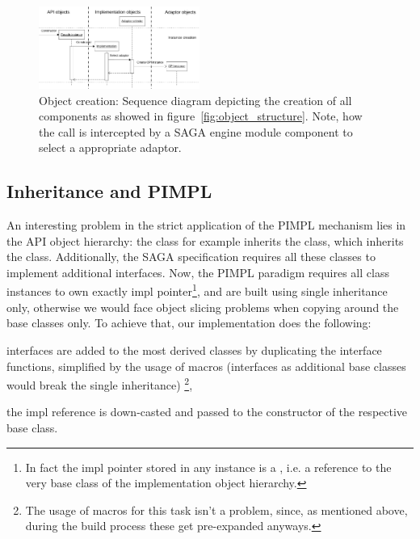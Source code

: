 \begin{figure}[!ht]
 \begin{center}
  \includegraphics[width=0.47\textwidth]{images/object_lifetime_creation}
  \caption{\label{fig:object_creation}
    Object creation: Sequence diagram depicting the creation of all
    components as showed in figure~\ref{fig:object_structure}. Note, how
    the call is intercepted by a SAGA engine module component to select 
    a appropriate adaptor.}
 \end{center}
\end{figure}

\subsection{Inheritance and PIMPL}

An interesting problem in the strict application of the PIMPL
mechanism lies in the API object hierarchy:  the  class
for example inherits the  class, which inherits the
 class.  Additionally, the SAGA specification requires
all these classes to implement additional interfaces.  Now, the PIMPL
paradigm requires all class instances to own exactly  impl
pointer\footnote{\small{In fact the impl pointer stored in any 
instance is a , i.e. a reference
to the very base class of the implementation object hierarchy.}}, and are 
built using single inheritance only, otherwise we would face object slicing 
problems when copying around the base classes only. To achieve that, 
our implementation does the following:

 \begin{shortlist}
   \item interfaces are added to the most derived classes by duplicating
   			 the interface functions, simplified by the usage of macros 
   			 (interfaces as additional base classes would break the single 
   			 inheritance) \footnote{\small{The usage of macros for this task 
   			 isn't a problem, since, as mentioned above, during the build 
   			 process these get pre-expanded anyways.}},
   \item the impl reference is down-casted and passed to the
   			 constructor of the respective base class.
 \end{shortlist}

